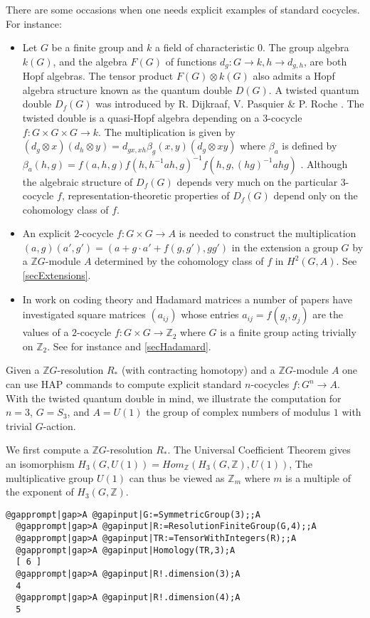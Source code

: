 \documentclass[a4paper,11pt]{report}
\begin{document}
{{ There are some occasions when one needs explicit examples of standard
cocycles. For instance: 
\begin{itemize}
\item  Let $G$ be a finite group and $k$ a field of characteristic $0$. The group algebra $k(G)$, and the algebra $F(G)$ of functions $d_g\colon G\rightarrow k, h\rightarrow d_{g,h}$, are both Hopf algebras. The tensor product $F(G) \otimes k(G)$ also admits a Hopf algebra structure known as the quantum double $D(G)$. A twisted quantum double $D_f(G)$ was introduced by R. Dijkraaf, V. Pasquier \& P. Roche \cite{dpr}. The twisted double is a quasi-Hopf algebra depending on a $3$-cocycle $f\colon G\times G\times G\rightarrow k$. The multiplication is given by $(d_g \otimes x)(d_h \otimes y) = d_{gx,xh}\beta_g(x,y)(d_g \otimes xy)$ where $\beta_a $ is defined by $\beta_a(h,g) = f(a,h,g) f(h,h^{-1}ah,g)^{-1} f(h,g,(hg)^{-1}ahg)$ . Although the algebraic structure of $D_f(G)$ depends very much on the particular $3$-cocycle $f$, representation-theoretic properties of $D_f(G)$ depend only on the cohomology class of $f$. 
\item  An explicit $2$-cocycle $f\colon G\times G\rightarrow A$ is needed to construct the multiplication $(a,g)(a',g') = (a + g\cdot a' + f(g,g'), gg')$ in the extension a group $G$ by a $\mathbb ZG$-module $A$ determined by the cohomology class of $f$ in $H^2(G,A)$. See \ref{secExtensions}. 
\item  In work on coding theory and Hadamard matrices a number of papers have
investigated square matrices $(a_{ij})$ whose entries $a_{ij}=f(g_i,g_j)$ are the values of a $2$-cocycle $f\colon G\times G \rightarrow \mathbb Z_2$ where $G$ is a finite group acting trivially on $\mathbb Z_2$. See for instance \cite{horadam} and \ref{secHadamard}. 
\end{itemize}
 

 Given a $\mathbb ZG$-resolution $R_\ast$ (with contracting homotopy) and a $\mathbb ZG$-module $A$ one can use HAP commands to compute explicit standard $n$-cocycles $f\colon G^n \rightarrow A$. With the twisted quantum double in mind, we illustrate the computation for $n=3$, $G=S_3$, and $A=U(1)$ the group of complex numbers of modulus $1$ with trivial $G$-action. 

 We first compute a $\mathbb ZG$-resolution $R_\ast$. The Universal Coefficient Theorem gives an isomorphism $H_3(G,U(1)) = Hom_{\mathbb Z}(H_3(G,\mathbb Z), U(1))$, The multiplicative group $U(1)$ can thus be viewed as $\mathbb Z_m$ where $m$ is a multiple of the exponent of $H_3(G,\mathbb Z)$. 
\begin{Verbatim}[commandchars=@|A,fontsize=\small,frame=single,label=Example]
  @gapprompt|gap>A @gapinput|G:=SymmetricGroup(3);;A
  @gapprompt|gap>A @gapinput|R:=ResolutionFiniteGroup(G,4);;A
  @gapprompt|gap>A @gapinput|TR:=TensorWithIntegers(R);;A
  @gapprompt|gap>A @gapinput|Homology(TR,3);A
  [ 6 ]
  @gapprompt|gap>A @gapinput|R!.dimension(3);A
  4
  @gapprompt|gap>A @gapinput|R!.dimension(4);A
  5
  

\end{Verbatim}}}
\end{document}
